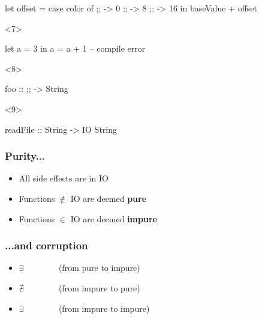 \documentclass[17pt]{beamer}
\renewcommand{\(}[1]{\begin{columns}[#1]}
\renewcommand{\)}{\end{columns}}
\newcommand{\<}[1]{\begin{column}{#1}}
\renewcommand{\>}{\end{column}}
\begin{document}
\begin{frame}[fragile]
\begin{minipage}[c][.5\textheight]{\textwidth}
\begin{center}
\begin{onlyenv}
      \begin{code}[gobble=8]
        let offset = case color of
                         ;;   ->  0
                         ;; ->  8
                         ;;  -> 16
        in baseValue + offset
      \end{code}
    \end{onlyenv}
    \begin{onlyenv}<7>
      \vfill
      \begin{code}[gobble=8]
        let a = 3
        in  a = a + 1 -- compile error
      \end{code}
      \vfill
    \end{onlyenv}
    \begin{onlyenv}<8>
      \begin{code}[gobble=8]
        foo :: ;; -> String
      \end{code}
    \end{onlyenv}
    \begin{onlyenv}<9>
      \begin{code}[gobble=8]
        readFile :: String -> IO String
      \end{code}
    \end{onlyenv}
  \end{center}
  \end{minipage}
\end{frame}

\begin{frame}[fragile]
  \frametitle{Purity...}
  \begin{itemize}
  \item All side effects are in IO
  \item<2-> Functions $\not\in$ IO are deemed \textbf{pure}
  \item<3-> Functions $\in$ IO are deemed \textbf{impure}
  \end{itemize}
\end{frame}

\begin{frame}[fragile]
  \frametitle{...and corruption}
  \begin{itemize}
  \item $\exists$ ~~ ~~~~~{\small (from pure to impure)}
  \item $\nexists$ ~~ ~~~~~{\small (from impure to pure)}
  \item<3-> $\exists$ ~~ ~~~~~{\small (from impure to impure)}
  \end{itemize}

  \begin{center}
  \end{center}
\end{frame}
\end{document}
